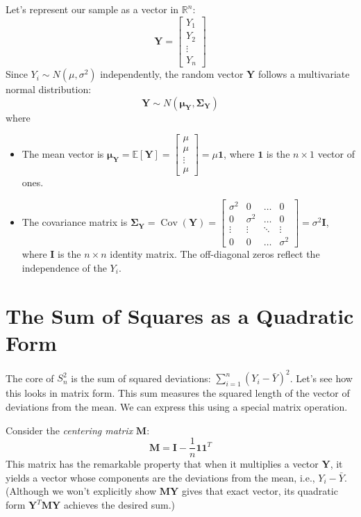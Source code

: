 \documentclass[11pt]{article}
\newcommand{\E}{\mathbb{E}} %
\newcommand{\Cov}{\operatorname{Cov}} %
\newcommand{\bY}{\bm{Y}} %
\newcommand{\bM}{\mathbf{M}} %
\newcommand{\bI}{\mathbf{I}} %
\newcommand{\bSigma}{\boldsymbol{\Sigma}} %
\newcommand{\bmu}{\boldsymbol{\mu}} %
\newcommand{\bone}{\mathbf{1}} %
\newcommand{\R}{\mathbb{R}} %
\begin{document}
Let's represent our sample as a vector in $\R^n$:
\[ \bY = \begin{bmatrix} Y_1 \\ Y_2 \\ \vdots \\ Y_n \end{bmatrix} \]
Since $Y_i \sim N(\mu, \sigma^2)$ independently, the random vector $\bY$ follows a multivariate normal distribution:
\[ \bY \sim N(\bmu_{\bY}, \bSigma_{\bY}) \]
where
\begin{itemize}
    \item The mean vector is $\bmu_{\bY} = \E[\bY] = \begin{bmatrix} \mu \\ \mu \\ \vdots \\ \mu \end{bmatrix} = \mu \bone$, where $\bone$ is the $n \times 1$ vector of ones.
    \item The covariance matrix is $\bSigma_{\bY} = \Cov(\bY) = \begin{bmatrix} \sigma^2 & 0 & \dots & 0 \\ 0 & \sigma^2 & \dots & 0 \\ \vdots & \vdots & \ddots & \vdots \\ 0 & 0 & \dots & \sigma^2 \end{bmatrix} = \sigma^2 \bI$, where $\bI$ is the $n \times n$ identity matrix. The off-diagonal zeros reflect the independence of the $Y_i$.
\end{itemize}

\section{The Sum of Squares as a Quadratic Form}

The core of $S_n^2$ is the sum of squared deviations: $\sum_{i=1}^n (Y_i - \bar{Y})^2$. Let's see how this looks in matrix form. This sum measures the squared length of the vector of deviations from the mean. We can express this using a special matrix operation.

Consider the \emph{centering matrix} $\bM$:
\[ \bM = \bI - \frac{1}{n}\bone\bone^T \]
This matrix has the remarkable property that when it multiplies a vector $\bY$, it yields a vector whose components are the deviations from the mean, i.e., $Y_i - \bar{Y}$. (Although we won't explicitly show $\bM\bY$ gives that exact vector, its quadratic form $\bY^T \bM \bY$ achieves the desired sum.)
\end{document}
